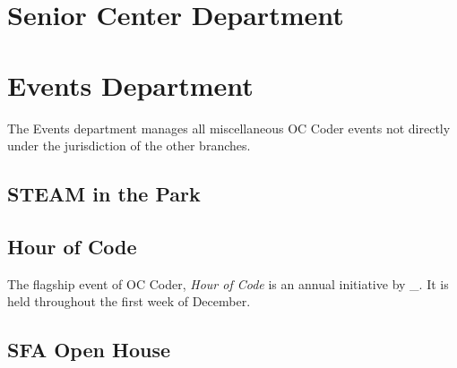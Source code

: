 \documentclass[twoside,11pt,letterpaper,abstracton]{scrartcl}
\begin{document}
\newpage

\section{Senior Center Department} \label{seniorcenter}

\newpage

\section{Events Department} \label{events}

The Events department manages all miscellaneous OC Coder events not directly under the jurisdiction of the other branches. 

\subsection{STEAM in the Park} \label{events-sitp}



\subsection{Hour of Code} \label{events-hoc}

The flagship event of OC Coder, \emph{Hour of Code} is an annual initiative by \_. It is held throughout the first week of December.

\subsection{SFA Open House} \label{events-openhouse}
\end{document}
